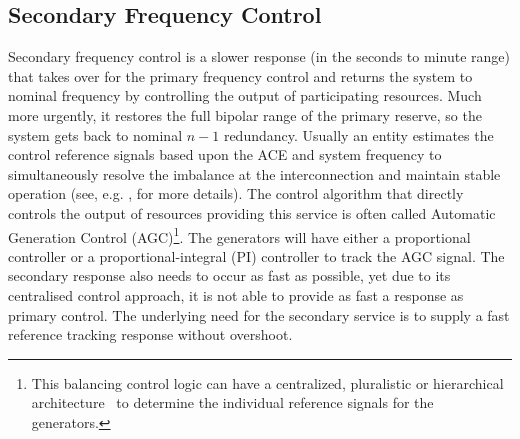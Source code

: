\subsection*{Secondary Frequency Control}
Secondary frequency control is a slower response (in the seconds to minute range) that takes over for the primary frequency control and returns the system to nominal frequency by controlling the output of participating resources. Much more urgently, it restores the full bipolar range of the primary reserve, so the system gets back to nominal $n-1$ redundancy. Usually an entity estimates the control reference signals based upon the ACE and system frequency to simultaneously resolve the imbalance at the interconnection and maintain stable operation (see, e.g. \cite{nerc2011balancing,entsoe2014continental}, for more details). The control algorithm that directly controls the output of resources providing this service is often called Automatic Generation Control (AGC)\footnote{This balancing control logic can have a centralized, pluralistic or hierarchical architecture~\cite{entsoe2014continental} to determine the individual reference signals for the generators.}. The generators will have either a proportional controller or a proportional-integral (PI) controller to track the AGC signal. The secondary response also needs to occur as fast as possible, yet due to its centralised control approach, it is not able to provide as fast a response as primary control. The underlying need for the secondary service is to supply a fast reference tracking response without overshoot.

